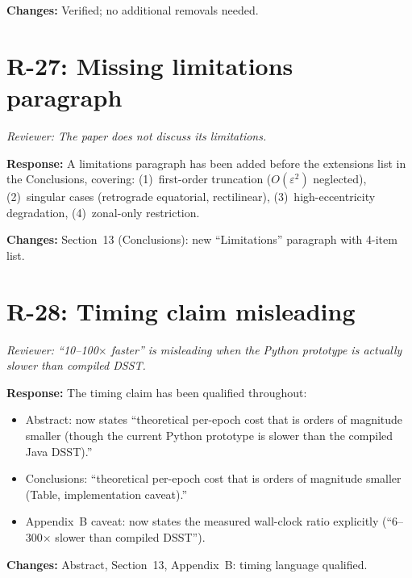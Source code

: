 \documentclass[11pt]{article}
\newcommand{\rev}[1]{\textcolor{revcolor}{\emph{#1}}}
\begin{document}
\textbf{Changes:} Verified; no additional removals needed.

\section*{R-27: Missing limitations paragraph}

\rev{Reviewer: The paper does not discuss its limitations.}

\textbf{Response:} A limitations paragraph has been added before the
extensions list in the Conclusions, covering:
(1)~first-order truncation ($O(\varepsilon^2)$ neglected),
(2)~singular cases (retrograde equatorial, rectilinear),
(3)~high-eccentricity degradation,
(4)~zonal-only restriction.

\textbf{Changes:} Section~13 (Conclusions): new ``Limitations'' paragraph
with 4-item list.

\section*{R-28: Timing claim misleading}

\rev{Reviewer: ``10--100$\times$ faster'' is misleading when the Python
prototype is actually slower than compiled DSST.}

\textbf{Response:} The timing claim has been qualified throughout:
\begin{itemize}[nosep]
\item Abstract: now states ``theoretical per-epoch cost that is orders of
  magnitude smaller (though the current Python prototype is slower than the
  compiled Java DSST).''
\item Conclusions: ``theoretical per-epoch cost that is orders of magnitude
  smaller (Table, implementation caveat).''
\item Appendix~B caveat: now states the measured wall-clock ratio explicitly
  (``6--300$\times$ slower than compiled DSST'').
\end{itemize}

\textbf{Changes:} Abstract, Section~13, Appendix~B: timing language qualified.
\end{document}
